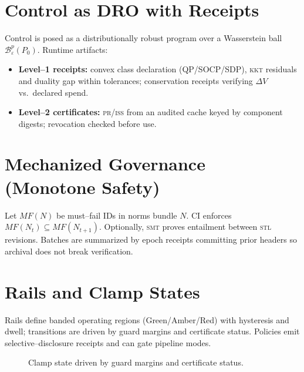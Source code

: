 \documentclass[11pt]{article}
\theoremstyle{plain}
\theoremstyle{remark}
\newcommand{\stl}{\textsc{stl}}
\newcommand{\smt}{\textsc{smt}}
\newcommand{\iss}{\textsc{iss}}
\newcommand{\pr}{\textsc{pr}}
\newcommand{\kkt}{\textsc{kkt}}
\begin{document}
\section{Control as DRO with Receipts}
\label{sec:dro}
Control is posed as a distributionally robust program over a Wasserstein ball $\mathcal{B}_\varepsilon^p(P_0)$. Runtime artifacts:
\begin{itemize}
  \item \textbf{Level--1 receipts:} convex class declaration (QP/SOCP/SDP), \kkt{} residuals and duality gap within tolerances; conservation receipts verifying $\Delta V$ vs.\ declared spend.
  \item \textbf{Level--2 certificates:} \pr/\iss{} from an audited cache keyed by component digests; revocation checked before use.
\end{itemize}

\section{Mechanized Governance (Monotone Safety)}
\label{sec:governance}
Let $MF(N)$ be must--fail IDs in norms bundle $N$. CI enforces $MF(N_t)\subseteq MF(N_{t+1})$.
Optionally, \smt{} proves entailment between \stl{} revisions. Batches are summarized by epoch receipts committing prior headers so archival does not break verification.

\section{Rails and Clamp States}
\label{sec:rails}
Rails define banded operating regions (Green/Amber/Red) with hysteresis and dwell; transitions are driven by guard margins and certificate status. Policies emit selective--disclosure receipts and can gate pipeline modes.

\begin{figure}[h]
  \centering
  \caption{Clamp state driven by guard margins and certificate status.}
  \label{fig:clamp}
\end{figure}
\end{document}

